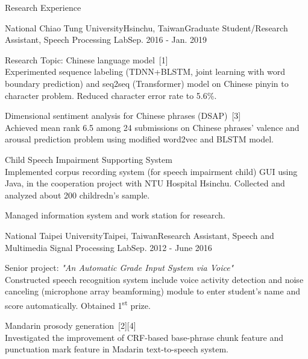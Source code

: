 \documentclass{resume} %
\newcommand{\ts}{\textsuperscript}
\begin{document}
\begin{rSection}{Research Experience}
    \begin{rSubsection}{National Chiao Tung University}{Hsinchu, Taiwan}{Graduate Student/Research Assistant, Speech Processing Lab}{Sep. 2016 - Jan. 2019}
        \item Research Topic: Chinese language model~[1]\\
        Experimented sequence labeling (TDNN+BLSTM, joint learning with word boundary prediction) and seq2seq (Transformer) model on Chinese pinyin to character problem. Reduced character error rate to 5.6\%.
        \item Dimensional sentiment analysis for Chinese phrases (DSAP)~[3] \\
        Achieved mean rank 6.5 among 24 submissions on Chinese phrases' valence and arousal prediction problem using modified word2vec and BLSTM model.
        \item Child Speech Impairment Supporting System\\
        Implemented corpus recording system (for speech impairment child) GUI using Java, in the cooperation project with NTU Hospital Hsinchu. Collected and analyzed about 200 childredn's sample.
        \item Managed information system and work station for research. 
    \end{rSubsection}
    \begin{rSubsection}{National Taipei University}{Taipei, Taiwan}{Research Assistant, Speech and Multimedia Signal Processing Lab}{Sep. 2012 - June 2016}
        \item Senior project: {\em "An Automatic Grade Input System via Voice"}\\
        Constructed speech recognition system include voice activity detection and noise canceling (microphone array beamforming) module to enter student's name and score automatically. Obtained 1\ts{st} prize.
        \item Mandarin prosody generation~[2][4]\\
        Investigated the improvement of CRF-based base-phrase chunk feature and punctuation mark feature in Madarin text-to-speech system.
    \end{rSubsection}
\end{rSection}
\end{document}
